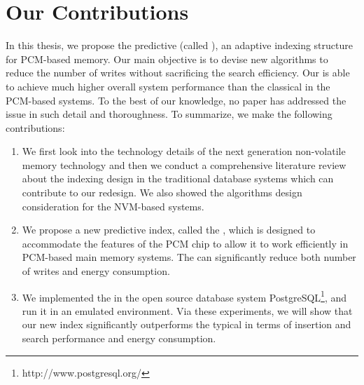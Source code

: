 
\section{Our Contributions}

In this thesis,
we propose the predictive \bplustree (called \bptree),
an adaptive indexing structure for PCM-based memory.
Our main objective is to devise new algorithms to reduce
the number of writes without sacrificing the search efficiency.
Our \bptree is able to achieve much higher overall system performance
than the classical \bplustree in the PCM-based systems.
To the best of our knowledge, no paper has addressed the issue in such
detail and thoroughness.
To summarize, we make the following contributions:

\begin{enumerate}
  \item We first look into the technology details of the next generation non-volatile memory technology and then we conduct a comprehensive literature review about the indexing design in the traditional database systems which can contribute to our redesign. We also showed the algorithms design consideration for the NVM-based systems. 

  \item We propose a new predictive \bplustree index, called the \bptree,
  which is designed to accommodate the features of the PCM chip to allow it to
  work efficiently in PCM-based main memory systems.
  The \bptree can significantly reduce both
  number of writes and energy consumption.


  \item We implemented the \bptree 
  in the open source database system PostgreSQL\footnote{http://www.postgresql.org/}, and run it in an emulated environment. Via these experiments, we will show that our new \bptree index significantly outperforms the typical \bplustree
  in terms of insertion and search performance and energy consumption.
\end{enumerate}

